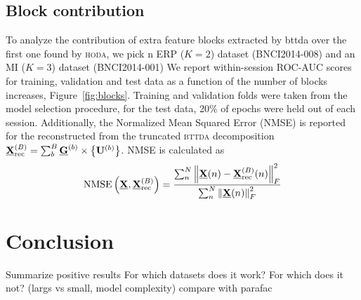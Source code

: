 \documentclass[twocolumn]{article}
\begin{document}
\subsection{Block contribution}
To analyze the contribution of extra feature blocks extracted by {bttda} over
the first one found by \textsc{hoda}, we pick n ERP ($K=2$) dataset
(BNCI2014-008) and an MI ($K=3$) dataset (BNCI2014-001)
We report within-session ROC-AUC scores for training, validation and test data as a function
of the number of blocks increases, Figure~\ref{fig:blocks}.
Training and validation folds were taken from the model selection procedure,
for the test data, 20\% of epochs were held out of each session.
Additionally, the Normalized Mean Squared Error (NMSE) is reported for the
reconstructed from the truncated \textsc{bttda} decomposition
$\textstyle{\underline{\mathbf{X}}_\text{rec}^{(B)}=\sum_b^B\underline{\mathbf{G}}^{(b)}\times\left\{\mathbf{U}^{(b)}\right\}}$.
NMSE is calculated as
\begin{equation}
  \operatorname{NMSE}\left(\underline{\mathbf{X}}, \underline{\mathbf{X}}_\text{rec}^{(B)}\right) =
  \frac{\sum_n^N\left\lVert\underline{\mathbf{X}}(n)-\underline{\mathbf{X}}_\text{rec}^{(B)}(n)\right\rVert_F^2}
  {\sum_n^N\left\lVert\underline{\mathbf{X}}(n)\right\rVert_F^2}
\end{equation}
\begin{figure*}[t]
  
  \caption{Normalized Mean Square Error (NMSE), (left), and difference in area
  under the receiver operating cure (ROC-AUC) for the training, validation and
  test data without feature selection (right), as a function of the number of BTTDA blocks $b$.
  While NMSE monotonically decreases for the evaluated datasets, better class
  separation will be achieved, but eventually overfitting occurs and validation
  and test scores will plateau or drop.
}
  \label{fig:blocks}
\end{figure*}


\section{Conclusion}
Summarize positive results
For which datasets does it work? For which does it not? (largs vs small, model
complexity)
compare with parafac
\end{document}
